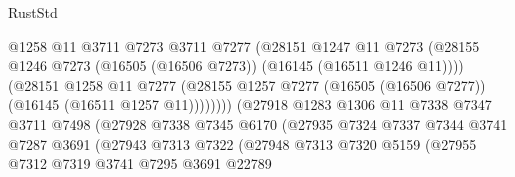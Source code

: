 \begin{lexlean}{RustStd}
\begin{coremodule}
                                      @1258
                                      @11
                                      @3711
                                      @7273
                                      @3711
                                      @7277
                                      (@28151
                                        @1247
                                        @11
                                        @7273
                                        (@28155
                                          @1246
                                          @7273
                                          (@16505 (@16506 @7273))
                                          (@16145 (@16511 @1246 @11))))
                                      (@28151
                                        @1258
                                        @11
                                        @7277
                                        (@28155
                                          @1257
                                          @7277
                                          (@16505 (@16506 @7277))
                                          (@16145 (@16511 @1257 @11))))))))
                              (@27918
                                @1283
                                @1306
                                @11
                                @7338
                                @7347
                                @3711
                                @7498
                                (@27928
                                  @7338
                                  @7345
                                  @6170
                                  (@27935
                                    @7324
                                    @7337
                                    @7344
                                    @3741
                                    @7287
                                    @3691
                                    (@27943
                                      @7313
                                      @7322
                                      (@27948
                                        @7313
                                        @7320
                                        @5159
                                        (@27955
                                          @7312
                                          @7319
                                          @3741
                                          @7295
                                          @3691
                                          @22789

\end{coremodule}
\end{lexlean}

